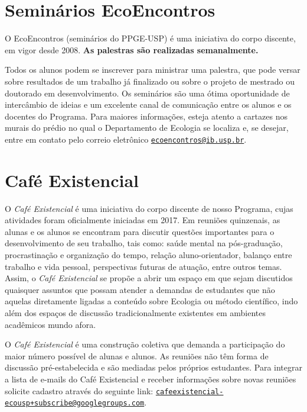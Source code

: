 \documentclass[twoside a4paper 12pt]{report}
\begin{document}
\section{Seminários EcoEncontros}
\label{subsec:seminarios}
O EcoEncontros (seminários do PPGE-USP) é uma iniciativa do corpo discente, em vigor desde 2008. \textbf{As palestras são realizadas semanalmente. }

Todos os alunos podem se inscrever para ministrar uma palestra, que pode versar sobre resultados de um trabalho já finalizado ou sobre o projeto de mestrado ou doutorado em desenvolvimento. Os seminários são uma ótima oportunidade de intercâmbio de ideias e um excelente canal de comunicação entre os alunos e os docentes do Programa. Para maiores informações, esteja atento a cartazes nos murais do prédio no qual o Departamento de Ecologia se localiza e, se desejar, entre em contato pelo correio eletrônico \href{mailto:ecoencontros@ib.usp.br}{\nolinkurl{ecoencontros@ib.usp.br}}.

\section{Café Existencial}
\label{cafe-existencial}

O \emph{Café Existencial} é uma iniciativa do corpo discente de nosso Programa, cujas atividades foram oficialmente iniciadas em 2017. Em reuniões quinzenais, as alunas e os alunos se encontram para discutir questões importantes para o desenvolvimento de seu trabalho, tais como: saúde mental na pós-graduação, procrastinação e organização do tempo, relação aluno-orientador, balanço entre trabalho e vida pessoal, perspectivas futuras de atuação, entre outros temas. Assim, o \emph{Café Existencial} se propõe a abrir um espaço em que sejam discutidos quaisquer assuntos que possam atender a demandas de estudantes que não aquelas diretamente ligadas a conteúdo sobre Ecologia ou método científico, indo além dos espaços de discussão tradicionalmente existentes em ambientes acadêmicos mundo afora.

O \emph{Café Existencial} é uma construção coletiva que demanda a participação do maior número possível de alunas e alunos. As reuniões não têm forma de discussão pré-estabelecida e são mediadas pelos próprios estudantes. Para integrar a lista de e-mails do Café Existencial e receber informações sobre novas reuniões solicite cadastro através do seguinte link: \href{mailto:cafeexistencial-ecousp+subscribe@googlegroups.com}{\nolinkurl{cafeexistencial-ecousp+subscribe@googlegroups.com}}.
\end{document}
